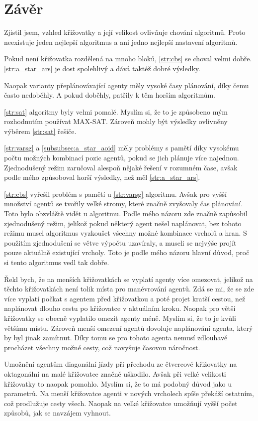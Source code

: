\chapter*{Závěr}


Zjistil jsem, vzhled křižovatky a její velikost ovlivňuje chování algoritmů.
Proto neexistuje jeden nejlepší algoritmus a ani jedno nejlepší nastavení algoritmů.

Pokud není křižovatka rozdělená na mnoho bloků, \ref{str:cbs} se choval velmi dobře.
\ref{str:a_star_ars} je dost spolehlivý a dává taktéž dobré výsledky.

Naopak varianty přeplánovávající agenty měly vysoké časy plánování, díky čemu často nedoběhly.
A pokud doběhly, patřily k těm horším algoritmům.

\ref{str:sat} algoritmy byly velmi pomalé.
Myslím si, že to je způsobeno mým rozhodnutím používat MAX-SAT\@.
Zároveň mohly být výsledky ovlivněny výběrem \ref{str:sat} řešiče.

\ref{str:varsg} a \ref{subsubsec:a_star_aoid} měly problémy s pamětí díky vysokému počtu možných kombinací
pozic agentů, pokud se jich plánuje více najednou.
Zjednodušený režim zaručoval alespoň nějaké řešení v rozumném čase, avšak podle mého způsoboval horší výsledky,
než měl \ref{str:a_star_ars}.

\ref{str:cbs} vyřešil problém s pamětí u \ref{str:varsg} algoritmu.
Avšak pro vyšší množství agentů se tvořily velké stromy, které značně zvyšovaly čas plánování.
Toto bylo obzvláště vidět u  algoritmu.
Podle mého názoru zde značně zapůsobil zjednodušený režim, jelikož pokud některý agent nešel naplánovat,
bez tohoto režimu musel algoritmus vyzkoušet všechny možné kombinace vrcholů a hran.
S použitím zjednodušení se větve výpočtu uzavíraly, a museli se nejvýše projít pouze aktuálně existující vrcholy.
Toto je podle mého názoru hlavní důvod, proč si tento algoritmus vedl tak dobře.

Řekl bych, že na menších křižovatkách se vyplatí agenty více omezovat, jelikož na těchto křižovatkách není tolik
místa pro manévrování agentů.
Zdá se mi, že se zde více vyplatí počkat s agentem před křižovatkou a poté projet kratší cestou,
než naplánovat dlouho cestu po křižovatce v aktuálním kroku.
Naopak pro větší křižovatky se obecně vyplatilo omezit agenty méně.
Myslím si, že to je kvůli většímu místu.
Zároveň menší omezení agentů dovoluje naplánování agenta, který by byl jinak zamítnut.
Díky tomu se pro tohoto agenta nemusí zdlouhavě procházet všechny možné cesty, což navyšuje časovou náročnost.

Umožnění agentům diagonální jízdy při přechodu ze čtvercové křižovatky na oktagonální na malé křižovatce značně uškodilo.
Avšak při velké velikosti křižovatky to naopak pomohlo.
Myslím si, že to má podobný důvod jako u parametrů.
Na menší křižovatce agenti v nových vrcholech spíše překáží ostatním, což prodlužuje cesty všech.
Naopak na velké křižovatce umožňují vyšší počet způsobů, jak se navzájem vyhnout.

